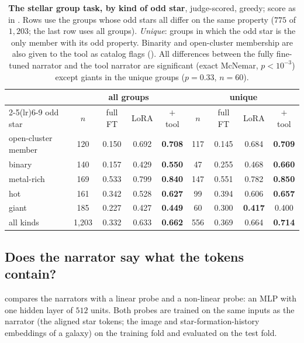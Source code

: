 \begin{table}[h]\centering\small
\caption{\textbf{The stellar group task, by kind of odd star}, judge-scored,
greedy; score as in . Rows use the groups whose odd stars all
differ on the same property ($775$ of $1{,}203$; the last row uses all groups). \emph{Unique}: groups in which
the odd star is the only member with its odd property. Binarity and open-cluster
membership are also given to the tool as catalog flags (). All
differences between the fully fine-tuned narrator and the tool narrator are significant
(exact McNemar, $p<10^{-3}$) except giants in the unique groups ($p=0.33$, $n=60$).}
\label{tab:perodd}
\begin{tabular}{lcccccccc}
\toprule
 & \multicolumn{4}{c}{all groups} & \multicolumn{4}{c}{unique} \\
\cmidrule(lr){2-5}\cmidrule(lr){6-9}
odd star & $n$ & full FT & LoRA & $+$ tool & $n$ & full FT & LoRA & $+$ tool \\
\midrule
open-cluster member & 120 & 0.150 & 0.692 & \textbf{0.708} & 117 & 0.145 & 0.684 & \textbf{0.709} \\
binary              & 140 & 0.157 & 0.429 & \textbf{0.550} &  47 & 0.255 & 0.468 & \textbf{0.660} \\
metal-rich          & 169 & 0.533 & 0.799 & \textbf{0.840} & 147 & 0.551 & 0.782 & \textbf{0.850} \\
hot                 & 161 & 0.342 & 0.528 & \textbf{0.627} &  99 & 0.394 & 0.606 & \textbf{0.657} \\
giant               & 185 & 0.227 & 0.427 & \textbf{0.449} &  60 & 0.300 & \textbf{0.417} & 0.400 \\
\midrule
all kinds           & 1{,}203 & 0.332 & 0.633 & \textbf{0.662} & 556 & 0.369 & 0.664 & \textbf{0.714} \\
\bottomrule
\end{tabular}
\end{table}

\subsection{Does the narrator say what the tokens contain?}\label{app:probevsnarrator}
 compares the narrators with a linear probe and a non-linear probe: an MLP with
one hidden layer of $512$ units. Both probes are trained on the same inputs as the narrator (the
aligned star tokens; the image and star-formation-history embeddings of a galaxy) on the
training fold and evaluated on the test fold.

